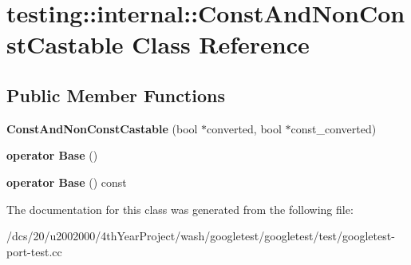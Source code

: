 \hypertarget{classtesting_1_1internal_1_1ConstAndNonConstCastable}{}\section{testing\+:\+:internal\+:\+:Const\+And\+Non\+Const\+Castable Class Reference}
\label{classtesting_1_1internal_1_1ConstAndNonConstCastable}
\subsection*{Public Member Functions}
\begin{DoxyCompactItemize}
\item 
\mbox{\label{classtesting_1_1internal_1_1ConstAndNonConstCastable_aebe0ef6897b7f805e227bb969d4ee034}} 
{\bfseries Const\+And\+Non\+Const\+Castable} (bool $\ast$converted, bool $\ast$const\+\_\+converted)
\item 
\mbox{\label{classtesting_1_1internal_1_1ConstAndNonConstCastable_aff0c372d429d76d002bb29f83f2429fa}} 
{\bfseries operator Base} ()
\item 
\mbox{\label{classtesting_1_1internal_1_1ConstAndNonConstCastable_a4e8ee8051162f1dfc1da294c71481e2f}} 
{\bfseries operator Base} () const
\end{DoxyCompactItemize}


The documentation for this class was generated from the following file\+:\begin{DoxyCompactItemize}
\item 
/dcs/20/u2002000/4th\+Year\+Project/wash/googletest/googletest/test/googletest-\/port-\/test.\+cc\end{DoxyCompactItemize}
